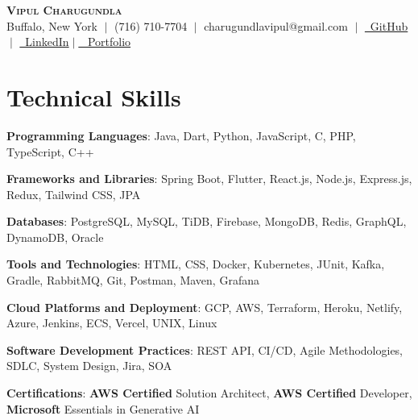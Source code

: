 \documentclass[calibri,10pt]{fed-res}
\begin{document}

\begin{center}
    \textbf{\LARGE  \scshape Vipul Charugundla} \\ \vspace{5pt}
    Buffalo, New York $\;|\;$ 
    (716) 710-7704 $\;|\;$ charugundlavipul@gmail.com $\;|\;$
    \href{https://github.com/Charugundlavipul}{\faGithub \ GitHub}$\;|\;$
    \href{https://www.linkedin.com/in/charugundla-vipul-3911561aa/}{\faLinkedin \ LinkedIn}$\;|\;$\href{https://vipulcharugundla.netlify.app/}{ \faBriefcase \ Portfolio}
\end{center} 
\vspace{-10pt}

\vspace{-4pt}
\section{Technical Skills}
\vspace{2pt}
\resumeSubHeadingListStart
\item \textbf{Programming Languages}{: Java, Dart, Python, JavaScript, C, PHP, TypeScript, C++}\vspace{-5pt}
\item \textbf{Frameworks and Libraries}{: Spring Boot, Flutter, React.js, Node.js, Express.js, Redux, Tailwind CSS, JPA}\vspace{-5pt}
\item \textbf{Databases}{: PostgreSQL, MySQL, TiDB, Firebase, MongoDB, Redis, GraphQL, DynamoDB, Oracle}\vspace{-5pt}
\item \textbf{Tools and Technologies}{: HTML, CSS, Docker, Kubernetes, JUnit, Kafka, Gradle, RabbitMQ, Git, Postman, Maven, Grafana}\vspace{-5pt}
\item \textbf{Cloud Platforms and Deployment}{:  GCP, AWS, Terraform, Heroku, Netlify, Azure, Jenkins, ECS, Vercel, UNIX, Linux}\vspace{-5pt}
\item \textbf{Software Development Practices}{: REST API, CI/CD, Agile Methodologies, SDLC, System Design, Jira, SOA}\vspace{-5pt}
\item \textbf{Certifications}{: \textbf{AWS Certified} Solution Architect, \textbf{AWS Certified} Developer,\textbf{ Microsoft} Essentials in Generative AI}\vspace{-5pt}
\resumeSubHeadingListEnd
\end{document}
